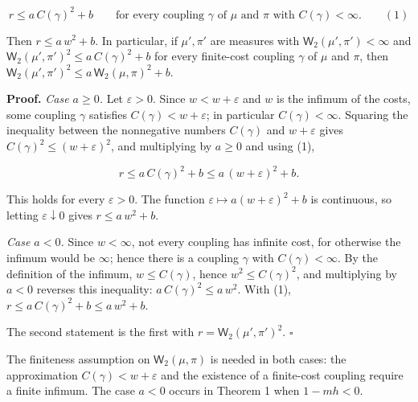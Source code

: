 \documentclass[11pt,a4paper]{article}
\begin{document}
\[r\le a\,C(\gamma)^2+b\qquad\text{for every coupling }\gamma\text{ of }\mu\text{ and }\pi\text{ with }C(\gamma)<\infty.\qquad(1)\]


Then \(r\le a\,w^2+b\). In particular, if \(\mu',\pi'\) are measures with \(\mathsf W_2(\mu',\pi')<\infty\) and \(\mathsf W_2(\mu',\pi')^2\le a\,C(\gamma)^2+b\) for every finite-cost coupling \(\gamma\) of \(\mu\) and \(\pi\), then \(\mathsf W_2(\mu',\pi')^2\le a\,\mathsf W_2(\mu,\pi)^2+b\).




\textbf{Proof.} \emph{Case \(a\ge0\).} Let \(\varepsilon>0\). Since \(w<w+\varepsilon\) and \(w\) is the infimum of the costs, some coupling \(\gamma\) satisfies \(C(\gamma)<w+\varepsilon\); in particular \(C(\gamma)<\infty\). Squaring the inequality between the nonnegative numbers \(C(\gamma)\) and \(w+\varepsilon\) gives \(C(\gamma)^2\le(w+\varepsilon)^2\), and multiplying by \(a\ge0\) and using (1),


\[r\le a\,C(\gamma)^2+b\le a\,(w+\varepsilon)^2+b.\]


This holds for every \(\varepsilon>0\). The function \(\varepsilon\mapsto a(w+\varepsilon)^2+b\) is continuous, so letting \(\varepsilon\downarrow0\) gives \(r\le a\,w^2+b\).




\emph{Case \(a<0\).} Since \(w<\infty\), not every coupling has infinite cost, for otherwise the infimum would be \(\infty\); hence there is a coupling \(\gamma\) with \(C(\gamma)<\infty\). By the definition of the infimum, \(w\le C(\gamma)\), hence \(w^2\le C(\gamma)^2\), and multiplying by \(a<0\) reverses this inequality: \(a\,C(\gamma)^2\le a\,w^2\). With (1), \(r\le a\,C(\gamma)^2+b\le a\,w^2+b\).




The second statement is the first with \(r=\mathsf W_2(\mu',\pi')^2\). \(\square\)




The finiteness assumption on \(\mathsf W_2(\mu,\pi)\) is needed in both cases: the approximation \(C(\gamma)<w+\varepsilon\) and the existence of a finite-cost coupling require a finite infimum. The case \(a<0\) occurs in Theorem 1 when \(1-mh<0\).
\end{document}
